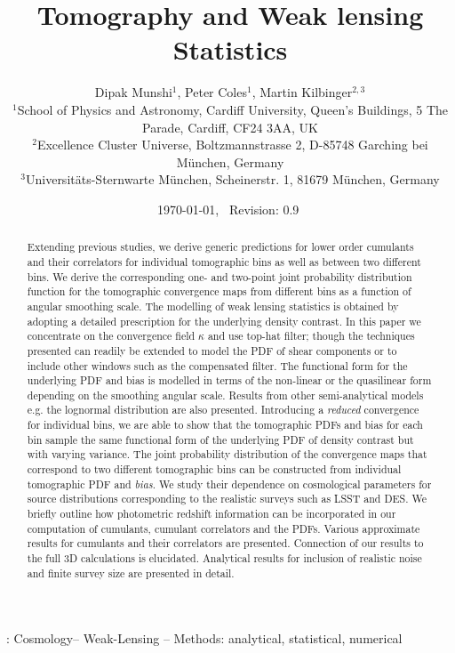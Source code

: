 \documentclass[usenatbib]{mn2e}
\date{\today,~ $ $Revision: 0.9 $ $}
\begin{document}
\onecolumn
%
\title[Tomography and Weak Lensing Statistics]
{Tomography and Weak lensing Statistics}
\author[Munshi et al.]
{Dipak Munshi$^{1}$, Peter Coles$^{1}$, Martin Kilbinger$^{2,3}$\\
$^{1}$School of Physics and Astronomy, Cardiff University, Queen's
Buildings, 5 The Parade, Cardiff, CF24 3AA, UK \\
$^{2}$Excellence Cluster Universe, Boltzmannstrasse 2, D-85748 Garching bei M\"unchen, Germany \\
$^{3}$Universit\"ats-Sternwarte M\"unchen, Scheinerstr. 1, 81679 M\"unchen, Germany}
\maketitle
\begin{abstract} 
Extending previous studies,
we derive generic predictions for lower order cumulants and their 
correlators for individual tomographic bins as well as between two different bins. We derive the 
corresponding one- and two-point joint probability distribution function for the tomographic
convergence maps from different bins as a function of angular smoothing scale.
The modelling of weak lensing statistics is obtained by adopting a detailed prescription for the underlying density contrast.
In this paper we concentrate on the convergence field $\kappa$ and use top-hat filter; 
though the techniques presented can readily be extended to model the PDF of 
shear components or to include other windows such as the compensated filter. The functional form for the 
underlying PDF and bias is modelled in terms of the non-linear or the quasilinear form
depending on the smoothing angular scale. Results from other semi-analytical models e.g. the lognormal distribution are also presented.
Introducing a {\em reduced} convergence for individual bins, we are able to show that the tomographic PDFs and
bias for each bin sample the same functional form of the underlying PDF of density contrast but with varying variance.
The joint probability distribution of the convergence maps that correspond to two different tomographic bins 
can  be constructed from individual tomographic PDF and {\em bias}.
We study their dependence on cosmological parameters
for source distributions corresponding to the realistic surveys such as LSST and DES.  
We briefly outline how photometric  redshift information can be incorporated in our computation of cumulants, 
cumulant correlators and the PDFs. Various  approximate results for cumulants and their correlators are
presented. Connection of our results to the full 3D calculations is elucidated. Analytical results for inclusion
of realistic noise and finite survey size are presented in detail. 
\end{abstract}
\begin{keywords}: Cosmology-- Weak-Lensing -- Methods: analytical, statistical, numerical
\end{keywords}
%
\end{document}
